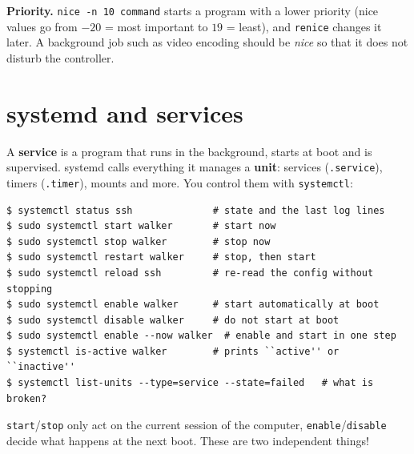 \textbf{Priority.} \texttt{nice -n 10 command} starts a program with a lower priority (nice values go from $-20$ = most important to $19$ = least), and \texttt{renice} changes it later. A background job such as video encoding should be \emph{nice} so that it does not disturb the controller.

\section*{systemd and services}
A \textbf{service} is a program that runs in the background, starts at boot and is supervised. systemd calls everything it manages a \textbf{unit}: services (\texttt{.service}), timers (\texttt{.timer}), mounts and more. You control them with \texttt{systemctl}:
\begin{verbatim}
$ systemctl status ssh              # state and the last log lines
$ sudo systemctl start walker       # start now
$ sudo systemctl stop walker        # stop now
$ sudo systemctl restart walker     # stop, then start
$ sudo systemctl reload ssh         # re-read the config without stopping
$ sudo systemctl enable walker      # start automatically at boot
$ sudo systemctl disable walker     # do not start at boot
$ sudo systemctl enable --now walker  # enable and start in one step
$ systemctl is-active walker        # prints ``active'' or ``inactive''
$ systemctl list-units --type=service --state=failed   # what is broken?
\end{verbatim}
\texttt{start}/\texttt{stop} only act on the current session of the computer, \texttt{enable}/\texttt{disable} decide what happens at the next boot. These are two independent things!

